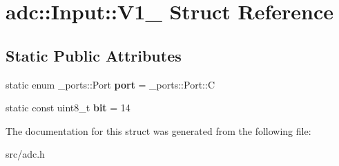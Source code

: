 \hypertarget{structadc_1_1Input_1_1V1__1}{}\section{adc\+:\+:Input\+:\+:V1\+\_ Struct Reference}
\label{structadc_1_1Input_1_1V1__1}
\subsection*{Static Public Attributes}
\begin{DoxyCompactItemize}
\item 
static enum \+\_\+ports\+::\+Port {\bfseries port} = \+\_\+ports\+::\+Port\+::C\hypertarget{structadc_1_1Input_1_1V1__1_a11d4045dc0d8c756784fa7c6dbcac1ca}{}\label{structadc_1_1Input_1_1V1__1_a11d4045dc0d8c756784fa7c6dbcac1ca}

\item 
static const uint8\+\_\+t {\bfseries bit} = 14\hypertarget{structadc_1_1Input_1_1V1__1_a810f3c569f78bd751aa399ace63d586d}{}\label{structadc_1_1Input_1_1V1__1_a810f3c569f78bd751aa399ace63d586d}

\end{DoxyCompactItemize}


The documentation for this struct was generated from the following file\+:\begin{DoxyCompactItemize}
\item 
src/adc.\+h\end{DoxyCompactItemize}
